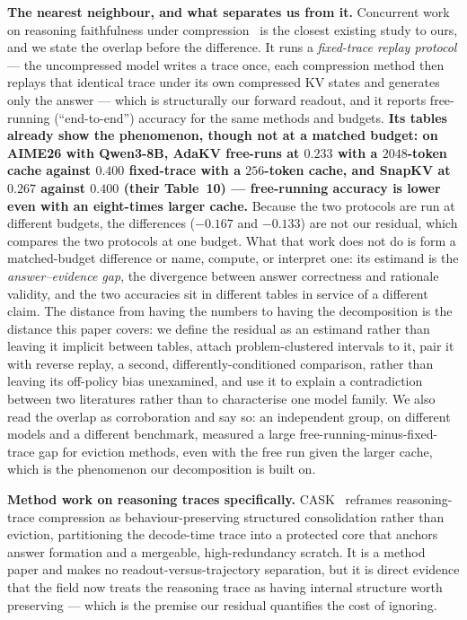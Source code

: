 \documentclass{article}
\begin{document}
\textbf{The nearest neighbour, and what separates us from it.} Concurrent work on reasoning faithfulness under compression~\citep{evidence2026} is the closest existing study to ours, and we state the overlap before the difference. It runs a \emph{fixed-trace replay protocol} --- the uncompressed model writes a trace once, each compression method then replays that identical trace under its own compressed KV states and generates only the answer --- which is structurally our forward readout, and it reports free-running (``end-to-end'') accuracy for the same methods and budgets. \textbf{Its tables already show the phenomenon, though not at a matched budget: on AIME26 with Qwen3-8B, AdaKV free-runs at $0.233$ with a $2048$-token cache against $0.400$ fixed-trace with a $256$-token cache, and SnapKV at $0.267$ against $0.400$ (their Table~10) --- free-running accuracy is lower even with an eight-times larger cache.} Because the two protocols are run at different budgets, the differences ($-0.167$ and $-0.133$) are not our residual, which compares the two protocols at one budget. What that work does not do is form a matched-budget difference or name, compute, or interpret one: its estimand is the \emph{answer--evidence gap}, the divergence between answer correctness and rationale validity, and the two accuracies sit in different tables in service of a different claim. The distance from having the numbers to having the decomposition is the distance this paper covers: we define the residual as an estimand rather than leaving it implicit between tables, attach problem-clustered intervals to it, pair it with reverse replay, a second, differently-conditioned comparison, rather than leaving its off-policy bias unexamined, and use it to explain a contradiction between two literatures rather than to characterise one model family. We also read the overlap as corroboration and say so: an independent group, on different models and a different benchmark, measured a large free-running-minus-fixed-trace gap for eviction methods, even with the free run given the larger cache, which is the phenomenon our decomposition is built on.

\textbf{Method work on reasoning traces specifically.} CASK~\citep{cask2026} reframes reasoning-trace compression as behaviour-preserving structured consolidation rather than eviction, partitioning the decode-time trace into a protected core that anchors answer formation and a mergeable, high-redundancy scratch. It is a method paper and makes no readout-versus-trajectory separation, but it is direct evidence that the field now treats the reasoning trace as having internal structure worth preserving --- which is the premise our residual quantifies the cost of ignoring.
\end{document}
